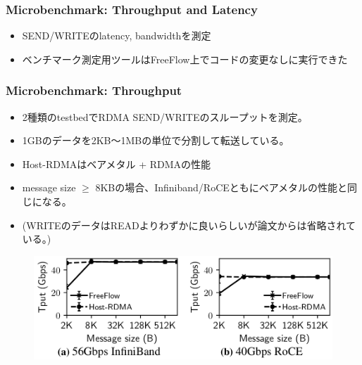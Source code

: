 \documentclass[dvipdfmx,9pt,notheorems]{beamer}
\theoremstyle{definition}
\begin{document}
\begin{frame}\frametitle{Microbenchmark: Throughput and Latency}
	\begin{itemize}
		\item SEND/WRITEのlatency, bandwidthを測定
		\item ベンチマーク測定用ツールはFreeFlow上で{\color{orange}コードの変更なしに実行できた}
	\end{itemize}
\end{frame}

\begin{frame}\frametitle{Microbenchmark: Throughput}
	\begin{itemize}
		\item 2種類のtestbedでRDMA SEND/WRITEのスループットを測定。
		\item 1GBのデータを2KB〜1MBの単位で分割して転送している。
		\item Host-RDMAはベアメタル + RDMAの性能
		\item message size $\geq$ 8KBの場合、Infiniband/RoCEともにベアメタルの性能と同じになる。
		\item (WRITEのデータはREADよりわずかに良いらしいが論文からは省略されている。)
	\end{itemize}
  \begin{figure}[htb]
    \centering
    \includegraphics[scale=1]{fig/figure9.png}
  \end{figure}
\end{frame}
\end{document}
